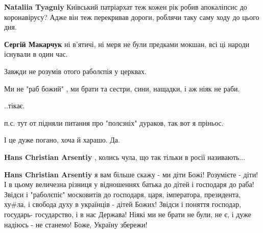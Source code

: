 \begin{itemize}
\begin{itemize}
 
\textbf{Nataliia Tyagniy} Київський патріархат теж кожен рік робив апокаліпсис до коронавірусу? Адже він теж перекривав дороги, роблячи таку саму ходу до цього дня.

 
\textbf{Сергій Макарчук} ні в'ятичі, ні меря не були предками мокшан, всі ці народи існували в один час.
\end{itemize}

 

Завжди не розумів отого раболєпія у церквах.

Ми не "раб божий" , ми брати та сестри, сини, нащадки, і аж ніяк не раби.

..тікає.

п.с. тут от підняли питання про "полєзніх" дураков, так вот я пріньос.

І це дуже погано, хоча й харашо. Да.

\begin{itemize}
 
\textbf{Hans Christian Arsentiy} , колись чула, що так тільки в росії називають...

 
\textbf{Hans Christian Arsentiy} я вам більше скажу - ми діти Божі! Розумієте - діти! І в цьому величезна різниця у відношеннях батька до дітей і господаря до раба! Звідси і "раболєпіє" московитів до господаря, царя, імператора, президента, ху\#ла, і свобода духу в українців - дітей Божих! Звідси і поняття господар, государь- государство, і в нас Держава! Ніякі ми не брати не були, не є, і дуже надіюсь - не станемо! Боже, Україну збережи!


\end{itemize}
\end{itemize}
